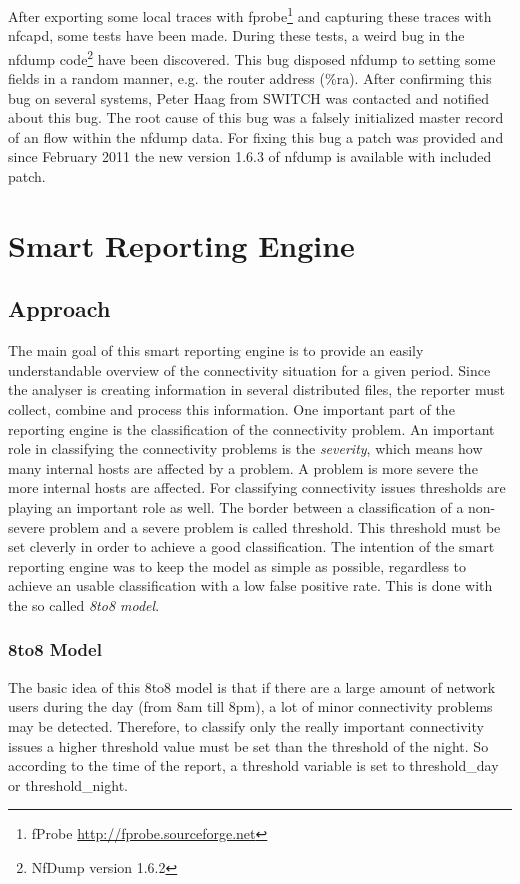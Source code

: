 After exporting some local traces with fprobe\footnote{fProbe
\url{http://fprobe.sourceforge.net}} and capturing these traces with nfcapd,
some tests have been made. During these tests, a weird bug in the nfdump
code\footnote{NfDump version 1.6.2} have been discovered. This bug disposed
nfdump to setting some fields in a random manner, e.g. the router address
(\%ra). After confirming this bug on several systems, Peter Haag from SWITCH was
contacted and notified about this bug. The root cause of this bug was a falsely
initialized master record of an flow within the nfdump data. For fixing this bug
a patch was provided and since February 2011 the new version 1.6.3 of nfdump is
available with included patch.

\section{Smart Reporting Engine}

\subsection{Approach} The main goal of this smart reporting engine is to provide
an easily understandable overview of the connectivity situation for a given
period. Since the analyser is creating information in several distributed files,
the reporter must collect, combine and process this information. One important
part of the reporting engine is the classification of the connectivity problem.
An important role in classifying the connectivity problems is the
\emph{severity}, which means how many internal hosts are affected by a problem.
A problem is more severe the more internal hosts are affected. For classifying
connectivity issues thresholds are playing an important role as well. The border
between a classification of a non-severe problem and a severe problem is called
threshold. This threshold must be set cleverly in order to achieve a good
classification. The intention of the smart reporting engine was to keep the
model as simple as possible, regardless to achieve an usable classification with
a low false positive rate. This is done with the so called \emph{8to8 model}.

\subsubsection{8to8 Model} The basic idea of this 8to8 model is that if there
are a large amount of network users during the day (from 8am till 8pm), a lot of
minor connectivity problems may be detected. Therefore, to classify only the
really important connectivity issues a higher threshold value must be set than
the threshold of the night. So according to the time of the report, a threshold
variable is set to threshold\_day or threshold\_night.

